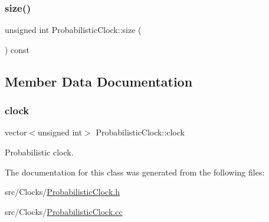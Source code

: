 \subsubsection{\texorpdfstring{size()}{size()}}
{\footnotesize\ttfamily unsigned int Probabilistic\+Clock\+::size (\begin{DoxyParamCaption}{ }\end{DoxyParamCaption}) const}



\subsection{Member Data Documentation}
\mbox{\label{class_probabilistic_clock_a4839958d0e2368cec8bb159b69ac0e76}} 
\subsubsection{\texorpdfstring{clock}{clock}}
{\footnotesize\ttfamily vector$<$unsigned int$>$ Probabilistic\+Clock\+::clock\hspace{0.3cm}{\ttfamily [private]}}



Probabilistic clock. 



The documentation for this class was generated from the following files\+:\begin{DoxyCompactItemize}
\item 
src/\+Clocks/\hyperlink{_probabilistic_clock_8h}{Probabilistic\+Clock.\+h}\item 
src/\+Clocks/\hyperlink{_probabilistic_clock_8cc}{Probabilistic\+Clock.\+cc}\end{DoxyCompactItemize}
